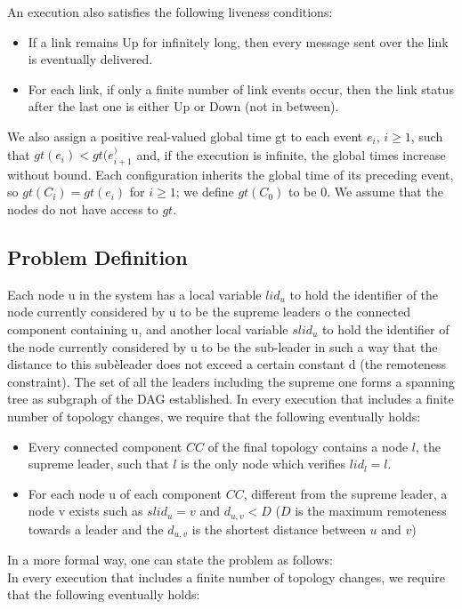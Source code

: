 \documentclass{article}
\begin{document}
An execution also satisfies the following liveness conditions:
\begin{itemize}
\item If a link remains Up for infinitely long, then every message sent over the link is eventually delivered.
\item For each link, if only a finite number of link events occur, then the link status after the last one is either Up or Down (not in between).
\end{itemize}

We also assign a positive real-valued global time gt to each event $e_i$, $i ≥ 1$, such that $gt(e_i) < gt(e_{i + 1}^)$ and, if the execution is infinite, the global times increase without bound. Each configuration inherits the global time of its preceding event, so $gt(C_i) = gt(e_i)$ for $i \geq 1$; we define $gt(C_0)$ to be $0$. We assume that the nodes do not have access to $gt$.

\subsection{Problem Definition}
Each node u in the system has a local variable $lid_{u}$ to hold the identifier of the node currently considered by u to be the supreme leaders o the connected component containing u, and another local variable $slid_u$ to hold the identifier of the node currently considered by u to be the sub-leader in such a way that the distance to this subèleader does not exceed a certain constant d (the remoteness constraint). The set of all the leaders including the supreme one forms a spanning tree as subgraph of the DAG established.
In every execution that includes a finite number of topology changes, we require that the following eventually holds:
\begin{itemize}
\item Every connected component $CC$ of the final topology contains a node $l$, the supreme leader, such that $l$ is the only node which verifies $ lid_{l} = l $.
\item For each node u of each component $CC$, different from the supreme leader, a node v exists such as $slid_{u} = v$ and $d_{u,v} < D$ ($D$ is the maximum remoteness towards a leader and the $ d_{u,v} $ is the shortest distance between $u$ and $v$)
\end{itemize}

In a more formal way, one can state the problem as follows:\\
In every execution that includes a finite number of topology changes, we require that the following eventually holds:
\end{document}
